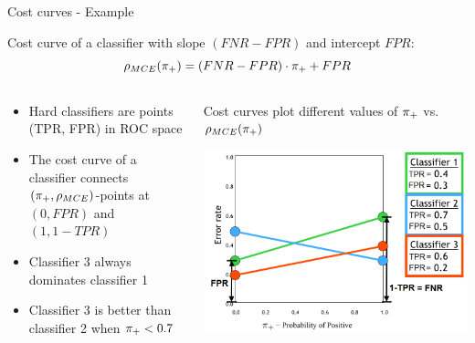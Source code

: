
\begin{vbframe}{Cost curves - Example}


Cost curve of a classifier with slope $(FNR - FPR)$ and intercept $FPR$:
$$\rho_{MCE}(\pi_{+}) = (FNR - FPR) \cdot \pi_{+} + FPR$$

\begin{columns}[T]
\begin{column}{0.49\textwidth}

\begin{itemize}
\item Hard classifiers are points (TPR, FPR) in ROC space
\item The cost curve of a classifier connects $(\pi_{+}, \rho_{MCE})$-points at
$(0, FPR)$ and $(1, 1-TPR)$
\item Classifier 3 always dominates classifier 1
\item Classifier 3 is better than classifier 2 when $\pi_{+} < 0.7$
\end{itemize}

\end{column}

\begin{column}{0.49\textwidth}
\centering
Cost curves plot different values of $\pi_{+}$ vs. $\rho_{MCE}(\pi_{+})$

\includegraphics[width=\textwidth]{figure_man/cost-curves-3.png}
\end{column}
\end{columns}
\end{vbframe}

